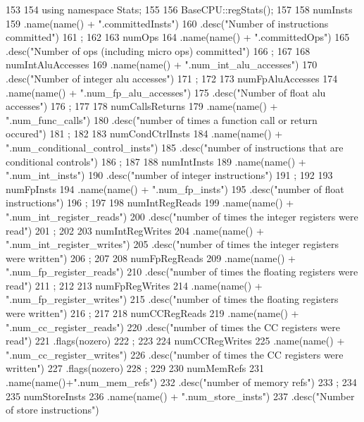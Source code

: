 \begin{DoxyCode}
153 {
154     using namespace Stats;
155 
156     BaseCPU::regStats();
157 
158     numInsts
159         .name(name() + ".committedInsts")
160         .desc("Number of instructions committed")
161         ;
162 
163     numOps
164         .name(name() + ".committedOps")
165         .desc("Number of ops (including micro ops) committed")
166         ;
167 
168     numIntAluAccesses
169         .name(name() + ".num_int_alu_accesses")
170         .desc("Number of integer alu accesses")
171         ;
172 
173     numFpAluAccesses
174         .name(name() + ".num_fp_alu_accesses")
175         .desc("Number of float alu accesses")
176         ;
177 
178     numCallsReturns
179         .name(name() + ".num_func_calls")
180         .desc("number of times a function call or return occured")
181         ;
182 
183     numCondCtrlInsts
184         .name(name() + ".num_conditional_control_insts")
185         .desc("number of instructions that are conditional controls")
186         ;
187 
188     numIntInsts
189         .name(name() + ".num_int_insts")
190         .desc("number of integer instructions")
191         ;
192 
193     numFpInsts
194         .name(name() + ".num_fp_insts")
195         .desc("number of float instructions")
196         ;
197 
198     numIntRegReads
199         .name(name() + ".num_int_register_reads")
200         .desc("number of times the integer registers were read")
201         ;
202 
203     numIntRegWrites
204         .name(name() + ".num_int_register_writes")
205         .desc("number of times the integer registers were written")
206         ;
207 
208     numFpRegReads
209         .name(name() + ".num_fp_register_reads")
210         .desc("number of times the floating registers were read")
211         ;
212 
213     numFpRegWrites
214         .name(name() + ".num_fp_register_writes")
215         .desc("number of times the floating registers were written")
216         ;
217 
218     numCCRegReads
219         .name(name() + ".num_cc_register_reads")
220         .desc("number of times the CC registers were read")
221         .flags(nozero)
222         ;
223 
224     numCCRegWrites
225         .name(name() + ".num_cc_register_writes")
226         .desc("number of times the CC registers were written")
227         .flags(nozero)
228         ;
229 
230     numMemRefs
231         .name(name()+".num_mem_refs")
232         .desc("number of memory refs")
233         ;
234 
235     numStoreInsts
236         .name(name() + ".num_store_insts")
237         .desc("Number of store instructions")
}
\end{DoxyCode}
